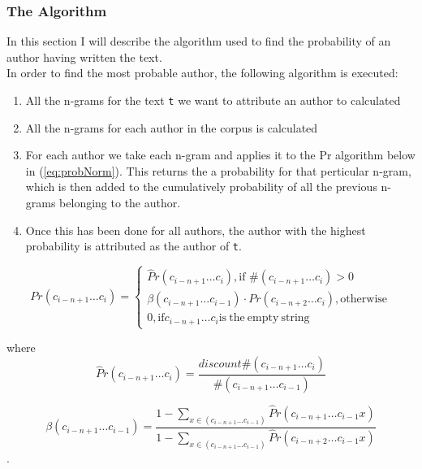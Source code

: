 \subsubsection*{The Algorithm}
In this section I will describe the algorithm used to find the probability of an author having written the text.\\

In order to find the most probable author, the following algorithm is executed:

\begin{enumerate}
\item All the n-grams for the text \texttt{t} we want to attribute an author to calculated
\item All the n-grams for each author in the corpus is calculated
\item For each author we take each n-gram and applies it to the Pr algorithm below in (\ref{eq:probNorm}). This returns the a probability for that perticular n-gram, which is then added to the cumulatively probability of all the previous n-grams belonging to the author. 
\item Once this has been done for all authors, the author with the highest probability is attributed as the author of \texttt{t}.
\end{enumerate}

\begin{equation}
\label{eq:probNorm}
Pr(c_{i - n + 1} \ldots c_{i}) = \left\{
\begin{array}{rl}
\hat{P}r(c_{i - n + 1} \ldots c_{i}), \text{if } \#(c_{i - n + 1} \ldots c_{i}) > 0\\
\beta(c_{i - n + 1} \ldots c_{i-1}) \cdot Pr(c_{i - n + 2} \ldots c_{i}), \mathrm{otherwise}\\
0, \mathrm{if} c_{i-n+1}\ldots c_i \mathrm{is\ the\ empty\ string}
\end{array} \right.
\end{equation}

where 
\begin{equation}
\label{eq:probHat}
\hat{P}r(c_{i - n + 1} \ldots c_{i}) = \frac{discount \#(c_{i - n + 1} \ldots c_{i})}{\#(c_{i - n + 1} \ldots c_{i-1})}
\end{equation}

\begin{equation}
\label{eq:beta}
\beta(c_{i - n + 1} \ldots c_{i-1}) = 
\frac
{1 - \sum_{x \in (c_{i - n + 1} \ldots c_{i-1})}\hat{P}r(c_{i - n + 1} \ldots c_{i-1} x)}
{1 - \sum_{x \in (c_{i - n + 1} \ldots c_{i-1})}\hat{P}r(c_{i - n + 2} \ldots c_{i-1} x)}
\end{equation}.

